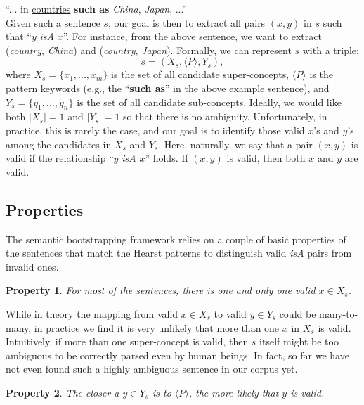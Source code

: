 \documentclass[10pt,journal,cspaper,compsoc]{IEEEtran}
\newtheorem{property}{Property}
\begin{document}
``... in \underline{countries} \textbf{such
 as} \emph{China}, \emph{Japan}, ...''\\

Given such a sentence $s$, our goal is then to extract all pairs $(x,y)$ in $s$ such that ``$y$ \emph{isA} $x$''. For instance, from the above sentence, we want to extract ({\em country}, {\em China}) and ({\em country}, {\em Japan}). 
Formally, we can represent $s$ with a triple:
$$s=(X_s,\langle P\rangle,Y_s),$$
where $X_s=\{x_1,...,x_m\}$ is the set of all candidate super-concepts, $\langle P\rangle$ is the pattern keywords (e.g., the ``\textbf{such as}'' in the above example sentence), and $Y_s=\{y_1,...,y_n\}$ is the set of all candidate sub-concepts. %
Ideally, we would like both $|X_s|=1$ and $|Y_s|=1$ so that there is no ambiguity. Unfortunately, in practice, this is rarely the case, and our goal is to identify those valid $x$'s and $y$'s among the candidates in $X_s$ and $Y_s$. Here, naturally, we say that a pair $(x,y)$ is valid if the relationship ``$y$ \emph{isA} $x$'' holds. If $(x,y)$ is valid, then both $x$ and $y$ are valid.

\subsection{Properties}\label{sec:extract:properties}

The semantic bootstrapping framework relies on a couple of basic properties of the sentences that match the Hearst patterns to distinguish valid \emph{isA} pairs from invalid ones.

\begin{property}\label{obsv:sup}
For most of the sentences, there is one and only one valid $x\in X_s$.
\end{property}

While in theory the mapping from valid $x\in X_s$ to valid $y\in Y_s$ could be many-to-many, in practice we find it is very unlikely that more than one $x$ in $X_s$ is valid.
Intuitively, if more than one super-concept is valid, then $s$ itself might be too ambiguous to be correctly parsed even by human beings.
In fact, so far we have not even found such a highly ambiguous sentence in our corpus yet.

\begin{property}\label{obsv:sub1}
The closer a $y\in Y_s$ is to $\langle P\rangle$, the more likely that $y$ is valid.
\end{property}
\end{document}
